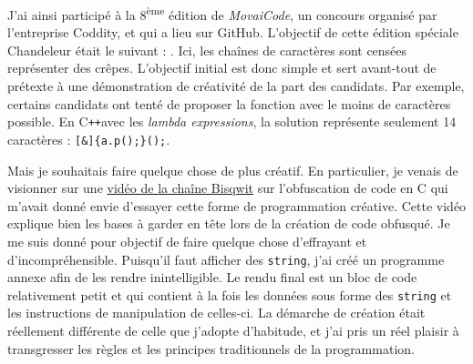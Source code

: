 \documentclass[12pt]{article} %
\newcommand{\ts}{\textsuperscript} %
\newcommand{\p}{\texttt{+}} %
\begin{document}
J'ai ainsi participé à la 8\ts{ème} édition de \textit{MovaiCode}, un concours organisé par l'entreprise Coddity, et qui a lieu sur GitHub. L'objectif de cette édition spéciale Chandeleur était le suivant :  \cite{movaicode-enonce8}. Ici, les chaînes de caractères sont censées représenter des crêpes. L'objectif initial est donc simple et sert avant-tout de prétexte à une démonstration de créativité de la part des candidats. Par exemple, certains candidats ont tenté de proposer la fonction avec le moins de caractères possible. En C\p\p \space avec les \textit{lambda expressions}, la solution représente seulement 14 caractères : \verb|[&]{a.p();}();|.

Mais je souhaitais faire quelque chose de plus créatif. En particulier, je venais de visionner sur une \href{https://youtu.be/rwOI1biZeD8}{vidéo de la chaîne Bisqwit} sur l'obfuscation de code en C \cite{Bisqwit-obfuscatedCCode} qui m'avait donné envie d'essayer cette forme de programmation créative. Cette vidéo explique bien les bases à garder en tête lors de la création de code obfusqué. Je me suis donné pour objectif de faire quelque chose d'effrayant et d'incompréhensible. Puisqu'il faut afficher des \verb|string|, j'ai créé un programme annexe afin de les rendre inintelligible. Le rendu final est un bloc de code relativement petit et qui contient à la fois les données sous forme des \verb|string| et les instructions de manipulation de celles-ci. La démarche de création était réellement différente de celle que j'adopte d'habitude, et j'ai pris un réel plaisir à transgresser les règles et les principes traditionnels de la programmation.
\end{document}
